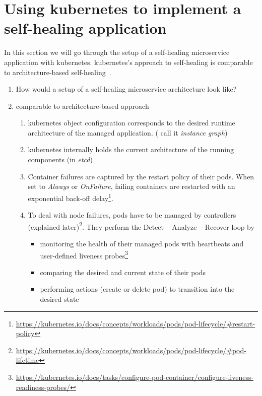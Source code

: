 
\section{Using \gls{kubernetes} to implement a self-healing application}
  In this section we will go through the setup of a self-healing microservice application with \gls{kubernetes}.
  \gls{kubernetes}'s approach to self-healing is comparable to architecture-based self-healing~\cite{ToffettiMicroservices,DashofyArchitecture}.
  

  \begin{enumerate}
    \item How would a setup of a self-healing microservice architecture look like?
    \item comparable to architecture-based approach
      \begin{enumerate}
        \item \gls{kubernetes} object configuration corresponds to the desired runtime architecture of the managed application. (\cite{ToffettiMicroservices} call it \textit{instance graph})
        \item \gls{kubernetes} internally holds the current architecture of the running components (in \textit{etcd})
        \item Container failures are captured by the restart policy of their pods. When set to \textit{Always} or \textit{OnFailure}, failing containers are restarted with an exponential back-off delay\footnote{\url{https://kubernetes.io/docs/concepts/workloads/pods/pod-lifecycle/\#restart-policy}}.
        \item To deal with node failures, pods have to be managed by controllers (explained later)\footnote{\url{https://kubernetes.io/docs/concepts/workloads/pods/pod-lifecycle/\#pod-lifetime}}. They perform the Detect -- Analyze -- Recover loop by
          \begin{itemize}
            \item monitoring the health of their managed pods with heartbeats and user-defined liveness probes\footnote{\url{https://kubernetes.io/docs/tasks/configure-pod-container/configure-liveness-readiness-probes/}}
            \item comparing the desired and current state of their pods
            \item performing actions (create or delete pod) to transition into the desired state
          \end{itemize}

\end{enumerate}
\end{enumerate}
